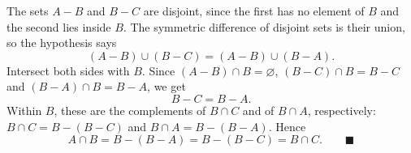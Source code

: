 The sets $A-B$ and $B-C$ are disjoint, since the first has no element of $B$ and the second lies inside $B$. The symmetric difference of disjoint sets is their union, so the hypothesis says
\[(A-B)\cup(B-C)=(A-B)\cup(B-A).\]
Intersect both sides with $B$. Since $(A-B)\cap B=\varnothing$, $(B-C)\cap B=B-C$ and $(B-A)\cap B=B-A$, we get
\[B-C=B-A .\]
Within $B$, these are the complements of $B\cap C$ and of $B\cap A$, respectively: $B\cap C=B-(B-C)$ and $B\cap A=B-(B-A)$. Hence
\[A\cap B=B-(B-A)=B-(B-C)=B\cap C .\qquad\blacksquare\]
